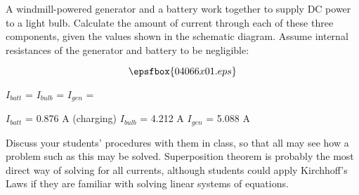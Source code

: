 

A windmill-powered generator and a battery work together to supply DC power to a light bulb.  Calculate the amount of current through each of these three components, given the values shown in the schematic diagram.  Assume internal resistances of the generator and battery to be negligible:

$$\epsfbox{04066x01.eps}$$

$I_{batt}$ = \hskip 100pt $I_{bulb}$ = \hskip 100pt $I_{gen}$ =

\vskip 10pt







$I_{batt}$ = 0.876 A (charging) \hskip 75pt $I_{bulb}$ = 4.212 A \hskip 75pt $I_{gen}$ = 5.088 A 







Discuss your students' procedures with them in class, so that all may see how a problem such as this may be solved.  Superposition theorem is probably the most direct way of solving for all currents, although students could apply Kirchhoff's Laws if they are familiar with solving linear systems of equations.





